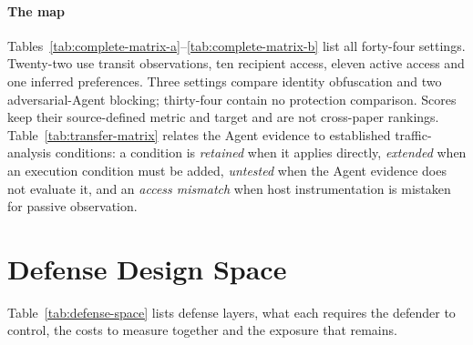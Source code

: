 \paragraph{The map}
Tables~\ref{tab:complete-matrix-a}--\ref{tab:complete-matrix-b} list all forty-four settings. Twenty-two use transit observations, ten recipient access, eleven active access and one inferred preferences. Three settings compare identity obfuscation and two adversarial-Agent blocking; thirty-four contain no protection comparison. Scores keep their source-defined metric and target and are not cross-paper rankings. Table~\ref{tab:transfer-matrix} relates the Agent evidence to established traffic-analysis conditions: a condition is \emph{retained} when it applies directly, \emph{extended} when an execution condition must be added, \emph{untested} when the Agent evidence does not evaluate it, and an \emph{access mismatch} when host instrumentation is mistaken for passive observation.






\section{Defense Design Space}\label{app:defense}
Table~\ref{tab:defense-space} lists defense layers, what each requires the defender to control, the costs to measure together and the exposure that remains.


